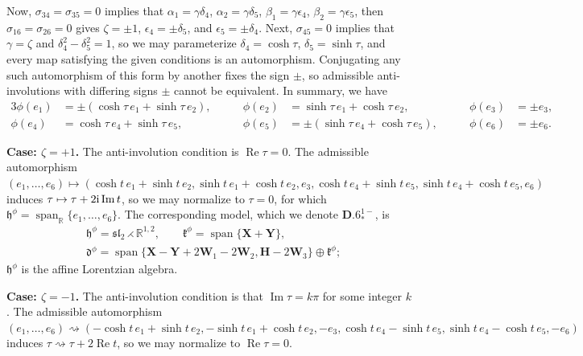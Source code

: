 \documentclass[pdftex]{sigma}
\DeclareMathOperator{\spanOperator}{span}
\renewcommand{\Im}{\operatorname{Im}}
\renewcommand{\Re}{\operatorname{Re}}
\newcommand{\Span}[1]{\spanOperator\{{#1}\}}
\newcommand{\bbR}{\mathbb{R}}
\newcommand{\mbH}{\mathbf{H}}
\newcommand{\mbW}{\mathbf{W}}
\newcommand{\mbX}{\mathbf{X}}
\newcommand{\mbY}{\mathbf{Y}}
\newcommand{\mfd} {\mathfrak{d}}
\newcommand{\mfh} {\mathfrak{h}}
\newcommand{\mfk} {\mathfrak{k}}
\newcommand{\mfsl} {\mathfrak{sl}}
\numberwithin{equation}{section}
\begin{document}
Now, $\sigma_{34} = \sigma_{35} = 0$ implies that $\alpha_1 = \gamma \delta_4$, $\alpha_2 = \gamma \delta_5$, $\beta_1 = \gamma \epsilon_4$, $\beta_2 = \gamma \epsilon_5$, then $\sigma_{16} = \sigma_{26} = 0$ gives $\zeta = \pm 1$, $\epsilon_4 = \pm \delta_5$, and $\epsilon_5 = \pm \delta_4$. Next, $\sigma_{45} = 0$ implies that $\gamma = \zeta$ and $\delta_4^2 - \delta_5^2 = 1$, so we may parameterize $\delta_4 = \cosh \tau$, $\delta_5 = \sinh \tau$, and every map satisfying the given conditions is an automorphism. Conjugating any such automorphism of this form by another fixes the sign $\pm$, so admissible anti-involutions with differing signs $\pm$ cannot be equivalent. In summary, we have
\begin{alignat*}{3}
	 \phi(e_1) &= \pm (\cosh \tau \, e_1 + \sinh \tau \, e_2) , \qquad
	&\phi(e_2) &= \sinh \tau \, e_1 + \cosh \tau \, e_2 , \qquad
	&\phi(e_3) &= \pm e_3 , \\
	 \phi(e_4) &= \cosh \tau \, e_4 + \sinh \tau \, e_5 , \qquad
	&\phi(e_5) &= \pm (\sinh \tau \, e_4 + \cosh \tau \, e_5) , \qquad
	&\phi(e_6) &= \pm e_6 .
\end{alignat*}

\noindent \textbf{Case: $\zeta = +1$.} The anti-involution condition is $\Re\tau = 0$. The admissible automorphism $(e_1, \ldots, e_6) \!\mapsto\! (\cosh t \, e_1 + \sinh t \, e_2, \sinh t \,e_1 + \cosh t \,e_2, e_3, \cosh t \, e_4 + \sinh t \, e_5, \sinh t \, e_4 + \cosh t \, e_5, e_6)$ induces $\tau \mapsto \tau + 2 {\rm i} \Im t$, so we may normalize to $\tau = 0$, for which $\mfh^{\phi} = \spanOperator_{\bbR}\{e_1, \ldots, e_6\}$. The corresponding model, which we denote $\mathbf{D.6}_{\ast}^{1-}$, is
\begin{equation*}
 \boxed{
 \begin{split}
& \mfh^{\phi} = \mfsl_2 \rightthreetimes \bbR^{1, 2} , \qquad
	 	 \mfk^{\phi} = \Span{\mbX + \mbY} , \\
& \mfd^{\phi} = \Span{\mbX - \mbY + 2 \mbW_1 - 2 \mbW_2, \mbH - 2 \mbW_3} \oplus \mfk^{\phi} ;
 \end{split}
	}
\end{equation*}
$\mfh^{\phi}$ is the affine Lorentzian algebra.

\smallskip
\noindent \textbf{Case: $\zeta = -1$.} The anti-involution condition is that $\Im \tau = k \pi$ for some integer $k$. The admissible automorphism $(e_1, \ldots, e_6) \rightsquigarrow (-\cosh t \, e_1 + \sinh t \, e_2, -\sinh t \, e_1 + \cosh t \, e_2, -e_3, \cosh t \, e_4 - \sinh t \, e_5, \sinh t \, e_4 - \cosh t \, e_5, -e_6 )$ induces $\tau \rightsquigarrow \tau + 2 \Re t$, so we may normalize to $\Re \tau = 0$.
\end{document}
